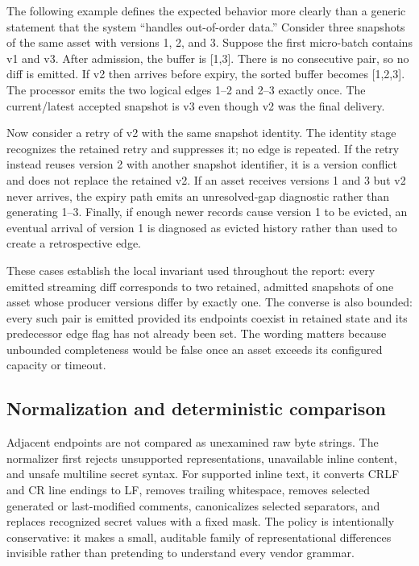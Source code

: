 \documentclass[a4paper,11pt]{article}
\begin{document}
The following example defines the expected behavior more clearly than a generic statement that the system ``handles out-of-order data.'' Consider three snapshots of the same asset with versions 1, 2, and 3. Suppose the first micro-batch contains v1 and v3. After admission, the buffer is [1,3]. There is no consecutive pair, so no diff is emitted. If v2 then arrives before expiry, the sorted buffer becomes [1,2,3]. The processor emits the two logical edges 1--2 and 2--3 exactly once. The current/latest accepted snapshot is v3 even though v2 was the final delivery.

Now consider a retry of v2 with the same snapshot identity. The identity stage recognizes the retained retry and suppresses it; no edge is repeated. If the retry instead reuses version 2 with another snapshot identifier, it is a version conflict and does not replace the retained v2. If an asset receives versions 1 and 3 but v2 never arrives, the expiry path emits an unresolved-gap diagnostic rather than generating 1--3. Finally, if enough newer records cause version 1 to be evicted, an eventual arrival of version 1 is diagnosed as evicted history rather than used to create a retrospective edge.

These cases establish the local invariant used throughout the report: every emitted streaming diff corresponds to two retained, admitted snapshots of one asset whose producer versions differ by exactly one. The converse is also bounded: every such pair is emitted provided its endpoints coexist in retained state and its predecessor edge flag has not already been set. The wording matters because unbounded completeness would be false once an asset exceeds its configured capacity or timeout.

\subsection{Normalization and deterministic comparison}

Adjacent endpoints are not compared as unexamined raw byte strings. The normalizer first rejects unsupported representations, unavailable inline content, and unsafe multiline secret syntax. For supported inline text, it converts CRLF and CR line endings to LF, removes trailing whitespace, removes selected generated or last-modified comments, canonicalizes selected separators, and replaces recognized secret values with a fixed mask. The policy is intentionally conservative: it makes a small, auditable family of representational differences invisible rather than pretending to understand every vendor grammar.
\end{document}
